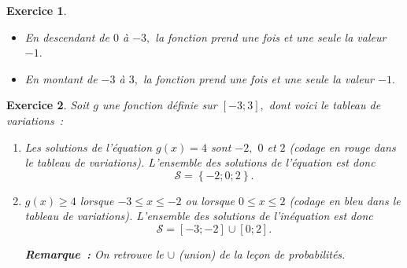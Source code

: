 \documentclass[10pt]{article}
\newtheorem{exo}{Exercice}
\begin{document}
\begin{exo}
\begin{multicols}{2}
\begin{center}
\end{center}


\begin{itemize}
\item[\textbullet] En descendant de $0$ à $-3,$ la fonction prend une fois et une seule la valeur $-1.$
\item[\textbullet] En montant de $-3$ à $3,$ la fonction prend une fois et une seule la valeur $-1.$
\end{itemize}

\end{multicols}



\end{exo}

\begin{exo}

Soit $g$ une fonction définie sur $\left[-3;3\right],$ dont voici le tableau de variations~:

\begin{center}
\end{center}


\begin{enumerate}
\item Les solutions de l'équation $g(x)=4$ sont $-2,$ $0$ et $2$ (codage en rouge dans le tableau de variations). L'ensemble des solutions de l'équation est donc \[\mathcal{S}=\left\{-2;0;2\right\}.\]
\item  $g(x)\geq 4$ lorsque $-3\leq x\leq -2$ ou lorsque $0\leq x\leq 2$ (codage en bleu dans le tableau de variations). L'ensemble des solutions de l'inéquation est donc 
\[\mathcal{S}=\left[-3;-2\right]\cup\left[0;2\right].\]

\medskip

\textbf{Remarque~:} On retrouve le $\cup$ (union) de la leçon de probabilités.
\end{enumerate}

\end{exo}
\end{document}
